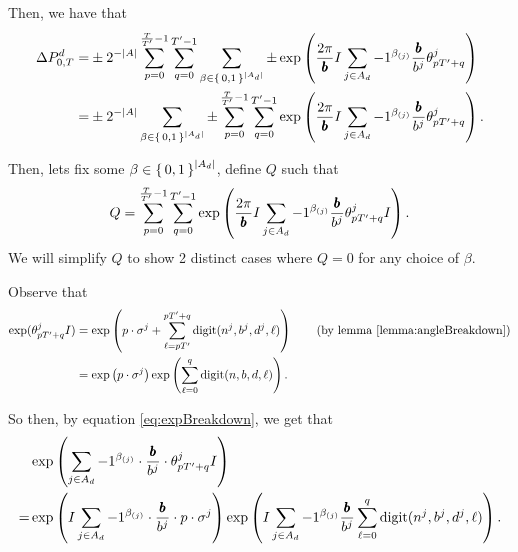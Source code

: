 Then, we have that
\begin{align*}
 \Delta P_{0, T}^d =&
  \pm 2^{-|A|} \sum_{p= 0}^{\frac{T}{{T}'} - 1} \sum_{q = 0}^{{T}' - 1}
 \sum_{\beta \in \set{0,1}^{|A_d|}} 
 	 \pm
    \exp\left(
      	\frac{2\pi}{{\pmb{b}}} I
        \sum_{j \in A_d} -1 ^ {\beta_{(j)}}
        \frac{{\pmb{b}}}{b^j} {\theta^j_{p {T}' + q}}
      \right)\\
 =&
  \pm 2^{-|A|} 
 \sum_{\beta \in \set{0,1}^{|A_d|}} 
		\pm
     \sum_{p= 0}^{\frac{T}{{T}'} - 1} \sum_{q = 0}^{{T}' - 1}
    \exp\left(
      	\frac{2\pi}{{\pmb{b}}} I
        \sum_{j \in A_d} -1 ^ {\beta_{(j)}}
        \frac{{\pmb{b}}}{b^j} {\theta^j_{p {T}' + q}}
      \right).
\end{align*}

\newcommand{\eqWTSInnerProd}{
  \sum_{p= 0}^{\frac{\totalPeriod}{\rationalPeriodTotal} - 1} \sum_{q = 0}^{\rationalPeriodTotal - 1}
    \exp\left(
      	\commonToAngle I 
        \sum_{j \in A_d} -1 ^ {\beta_{(j)}}
        \numbToCommon 
        \rationalAngle{p \rationalPeriodTotal + q}I
      \right)}

Then, lets fix some $\beta \in \set{0, 1}^{|A_d|}$, define $Q$ such that
\begin{equation}
\label{eq:wts01}  
  Q = \eqWTSInnerProd.
\end{equation}
We will simplify $Q$ to show 2 distinct cases where $Q = 0$ for any choice of $\beta$.

Observe that 
\begin{align}
  \exp(\rationalAngle{p \rationalPeriodTotal + q}I)
  &= \exp\left(
      p \cdot \digSumPeriodic +
      \sum_{\ell = p \rationalPeriodTotal}^{p \rationalPeriodTotal + q}\mathrm{digit}(n^j, b^j, d^j, \ell)\right)\tag{by lemma \ref{lemma:angleBreakdown}} \\
      \label{eq:expBreakdown}
      &= \exp\left(p \cdot \digSumPeriodic\right) \exp\left(\sum_{\ell = 0}^{q}\mathrm{digit}(n, b, d, \ell)\right).
\end{align}

So then, by equation \eqref{eq:expBreakdown}, we get that
\begin{align}
&\exp\left(
    \sum_{j \in A_d} -1 ^ {\beta_{(j)}}
    \cdot
    \frac{{\pmb{b}}}{b^j} \cdot
    {\theta^j_{p {T}'+ q}}I
\right)\notag \\ 
\label{eq:decomposeExp}
=&
\exp\left(
    I \sum_{j \in A_d} -1 ^ {\beta_{(j)}}
    \cdot
    \frac{{\pmb{b}}}{b^j}
    \cdot p \cdot
    \sigma^j
\right)
\exp\left(
    I \sum_{j \in A_d} -1 ^ {\beta_{(j)}} \frac{{\pmb{b}}}{b^j}
      \sum_{\ell = 0}^{q}\mathrm{digit}(n^j, b^j, d^j, \ell)
\right).
\end{align}

